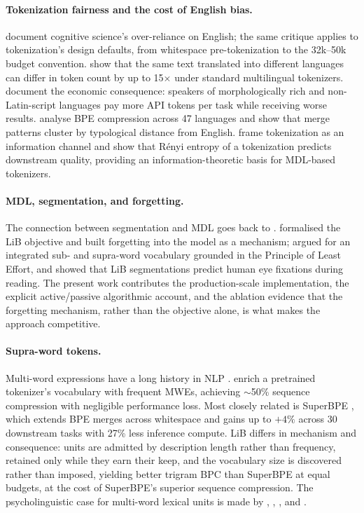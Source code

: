 \documentclass[pdflatex,sn-apa]{sn-jnl}
\begin{document}
\paragraph{Tokenization fairness and the cost of English bias.}
\citet{blasi2022overreliance} document cognitive science's over-reliance on
English; the same critique applies to tokenization's design defaults, from
whitespace pre-tokenization to the 32k--50k budget convention.
\citet{petrov2023unfairness} show that the same text translated into different
languages can differ in token count by up to 15$\times$ under standard
multilingual tokenizers.
\citet{ahia2023languages} document the economic consequence: speakers of
morphologically rich and non-Latin-script languages pay more API tokens per
task while receiving worse results.
\citet{gutierrez-vasques2023looking} analyse BPE compression across 47
languages and show that merge patterns cluster by typological distance from
English.
\citet{zouhar2023tokenization} frame tokenization as an information channel and
show that Rényi entropy of a tokenization predicts downstream quality,
providing an information-theoretic basis for MDL-based tokenizers.

\paragraph{MDL, segmentation, and forgetting.}
The connection between segmentation and MDL goes back to
\citet{brent1999efficient}.
\citet{yang2020less} formalised the LiB objective and built forgetting into
the model as a mechanism; \citet{yang2024rethinking} argued for
an integrated sub- and supra-word vocabulary grounded in the Principle of
Least Effort, and \citet{yang2022eyefixations} showed that LiB segmentations
predict human eye fixations during reading.
The present work contributes the production-scale implementation, the
explicit active/passive algorithmic account, and the ablation evidence that
the forgetting mechanism, rather than the objective alone, is what makes
the approach competitive.

\paragraph{Supra-word tokens.}
Multi-word expressions have a long history in NLP
\citep{sag2002multiword,constant2017multiword}.
\citet{gee2023multiword} enrich a pretrained tokenizer's vocabulary with
frequent MWEs, achieving $\sim$50\% sequence compression with negligible
performance loss.
Most closely related is SuperBPE \citep{liu2025superbpe}, which extends BPE
merges across whitespace and gains up to $+4\%$ across 30 downstream tasks
with 27\% less inference compute.
LiB differs in mechanism and consequence: units are admitted by description
length rather than frequency, retained only while they earn their keep, and
the vocabulary size is discovered rather than imposed, yielding better
trigram BPC than SuperBPE at equal budgets, at the cost of SuperBPE's
superior sequence compression.
The psycholinguistic case for multi-word lexical units is made by
\citet{wray2002formulaic}, \citet{siyanova2011collocation},
\citet{christiansen2017more}, and \citet{arnon2021starting}.
\end{document}
